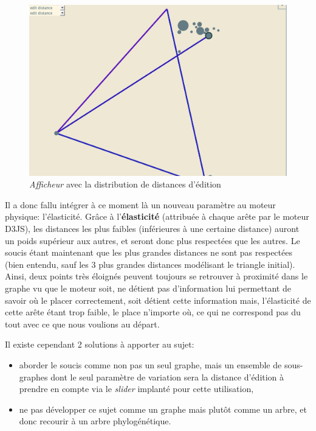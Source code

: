 \documentclass[pdftex,12pt,a4paper]{report}
\begin{document}
\begin{spacing}{1.2}
\begin{figure}[H]
\begin{center}
	\includegraphics[scale=0.5]{img/Edit-Distance-Ex.jpg}
\end{center}
\caption{\textit{Afficheur} avec la distribution de distances d'édition}
\end{figure}

Il a donc fallu intégrer à ce moment là un nouveau paramètre au moteur physique: l'élasticité. Grâce à l'\textbf{élasticité} (attribuée à chaque arête par le moteur D3JS), les distances les plus faibles (inférieures à une certaine distance) auront un poids supérieur aux autres, et seront donc plus respectées que les autres.
Le soucis étant maintenant que les plus grandes distances ne sont pas respectées (bien entendu, sauf les 3 plus grandes distances modélisant le triangle initial). Ainsi, deux points très éloignés peuvent toujours se retrouver à proximité dans le graphe vu que le moteur soit, ne détient pas d'information lui permettant de savoir où le placer correctement, soit détient cette information mais, l'élasticité de cette arête étant trop faible, le place n'importe où, ce qui ne correspond pas du tout avec ce que nous voulions au départ.

Il existe cependant 2 solutions à apporter au sujet:
\begin{itemize}
\item{aborder le soucis comme non pas un seul graphe, mais un ensemble de sous-graphes dont le seul paramètre de variation sera la distance d'édition à prendre en compte via le \textit{slider} implanté pour cette utilisation,}
\item{ne pas développer ce sujet comme un graphe mais plutôt comme un arbre, et donc recourir à un arbre phylogénétique.}
\end{itemize}


\end{spacing}
\end{document}
